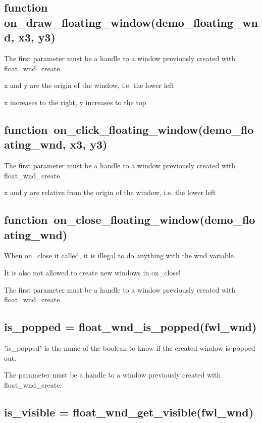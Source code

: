 \documentclass[11pt,parskip=half,a4paper]{scrartcl}
\begin{document}
\subsection{\hspace*{1.0mm}function on\_draw\_floating\_window(demo\_floating\_wnd, x3, y3)}

The first parameter must be a handle to a window previously created with float\_wnd\_create.

x and y are the origin of the window, i.e. the lower left

x increases to the right, y increases to the top

\subsection{\hspace*{1.0mm}function\ on\_click\_floating\_window(demo\_floating\_wnd, x3, y3)}

The first parameter must be a handle to a window previously created with float\_wnd\_create.

x and y are relative from the origin of the window, i.e. the lower left

\subsection{\hspace*{1.0mm}function\ on\_close\_floating\_window(demo\_floating\_wnd)}

When on\_close it called, it is illegal to do anything with the wnd variable.

It is also not allowed to create new windows in on\_close!

The first parameter must be a handle to a window previously created with float\_wnd\_create.

\newpage
\subsection{\hspace*{1.0mm}is\_popped = float\_wnd\_is\_popped(fwl\_wnd)}

"is\_popped" is the name of the boolean to know if the created window is popped out.

The parameter must be a handle to a window previously created with float\_wnd\_create.

\subsection{\hspace*{1.0mm}is\_visible = float\_wnd\_get\_visible(fwl\_wnd)}
\end{document}

